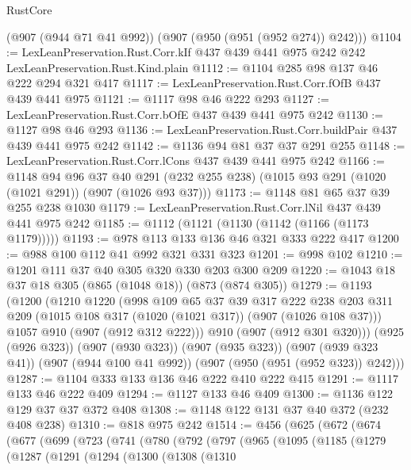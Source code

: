 \begin{lexlean}{RustCore}
\begin{coremodule}
      (@907 (@944 @71 @41 @992))
      (@907 (@950 (@951 (@952 @274)) @242)))
@1104 := LexLeanPreservation.Rust.Corr.kIf
    @437
    @439
    @441
    @975
    @242
    @242
    LexLeanPreservation.Rust.Kind.plain
@1112 := @1104 @285 @98 @137 @46 @222 @294 @321 @417
@1117 := LexLeanPreservation.Rust.Corr.fOfB @437 @439 @441 @975
@1121 := @1117 @98 @46 @222 @293
@1127 := LexLeanPreservation.Rust.Corr.bOfE @437 @439 @441 @975 @242
@1130 := @1127 @98 @46 @293
@1136 := LexLeanPreservation.Rust.Corr.buildPair @437 @439 @441 @975 @242
@1142 := @1136 @94 @81 @37 @37 @291 @255
@1148 := LexLeanPreservation.Rust.Corr.lCons @437 @439 @441 @975 @242
@1166 := @1148
    @94
    @96
    @37
    @40
    @291
    (@232 @255 @238)
    (@1015 @93 @291 (@1020 (@1021 @291)) (@907 (@1026 @93 @37)))
@1173 := @1148 @81 @65 @37 @39 @255 @238 @1030
@1179 := LexLeanPreservation.Rust.Corr.lNil @437 @439 @441 @975 @242
@1185 := @1112 (@1121 (@1130 (@1142 (@1166 (@1173 @1179)))))
@1193 := @978 @113 @133 @136 @46 @321 @333 @222 @417
@1200 := @988 @100 @112 @41 @992 @321 @331 @323
@1201 := @998 @102
@1210 := @1201 @111 @37 @40 @305 @320 @330 @203 @300 @209
@1220 := @1043 @18 @37 @18 @305 (@865 (@1048 @18)) (@873 (@874 @305))
@1279 := @1193
    (@1200
      (@1210
        @1220
        (@998
          @109
          @65
          @37
          @39
          @317
          @222
          @238
          @203
          @311
          @209
          (@1015 @108 @317 (@1020 (@1021 @317)) (@907 (@1026 @108 @37)))
          @1057
          @910
          (@907 (@912 @312 @222)))
        @910
        (@907 (@912 @301 @320)))
      (@925 (@926 @323))
      (@907 (@930 @323))
      (@907 (@935 @323))
      (@907 (@939 @323 @41))
      (@907 (@944 @100 @41 @992))
      (@907 (@950 (@951 (@952 @323)) @242)))
@1287 := @1104 @333 @133 @136 @46 @222 @410 @222 @415
@1291 := @1117 @133 @46 @222 @409
@1294 := @1127 @133 @46 @409
@1300 := @1136 @122 @129 @37 @37 @372 @408
@1308 := @1148 @122 @131 @37 @40 @372 (@232 @408 @238)
@1310 := @818 @975 @242
@1514 := @456
    (@625
      (@672
        (@674
          (@677
            (@699
              (@723
                (@741
                  (@780
                    (@792
                      (@797
                        (@965
                          (@1095
                            (@1185
                              (@1279
                                (@1287
                                  (@1291
                                    (@1294
                                      (@1300
                                        (@1308
                                          (@1310

\end{coremodule}
\end{lexlean}
